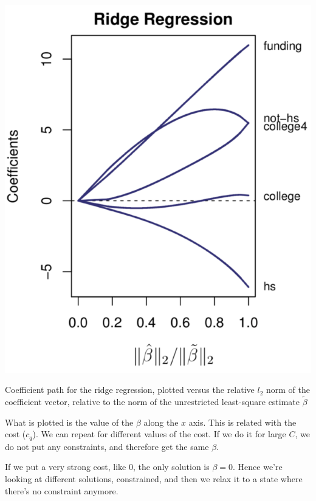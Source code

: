 \documentclass[a4paper]{tufte-book}
\begin{document}
\begin{marginfigure}
    \includegraphics{./Figures/ridgecrime.png}
    \caption{Coefficient path for the ridge regression, plotted versus the
        relative $l_2$ norm of the coefficient vector, relative to the norm of
        the unrestricted least-square estimate $\tilde \beta$
    }
    \label{ridgecrime}
\end{marginfigure}


What is plotted is the value of the $\beta$ along the $x$ axis. This is related
with the cost ($c_q$). 
We can repeat for different values of the cost.
If we do it for large $C$, we do not put any constraints, and therefore get the same $\beta$.

If we put a very strong cost, like 0, the only solution is $\beta = 0$.
Hence we’re looking at different solutions, constrained, and then we relax it to
a state where there’s no constraint anymore.
\end{document}

